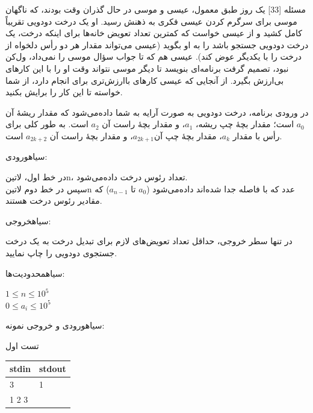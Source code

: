‌مسئله [33]
یک روز طبق معمول، عیسی و موسی در حال گذران وقت بودند، که ناگهان موسی برای سرگرم کردن عیسی فکری به ذهنش رسید. او یک درخت دودویی تقریباً کامل کشید و از عیسی خواست که کمترین تعداد تعویض خانه‌ها برای اینکه درخت، یک درخت دودویی جستجو باشد را به او بگوید (عیسی می‌تواند مقدار هر دو رأس دلخواه از درخت را با یکدیگر عوض کند). عیسی هم که تا جواب سؤال موسی را نمی‌داد، ول‌کن نبود، تصمیم گرفت برنامه‌ای بنویسد تا دیگر موسی نتواند وقت او را با این کارهای بی‌ارزش بگیرد. از آنجایی که عیسی کارهای باارزش‌تری برای انجام دارد، از شما خواسته تا این کار را برایش بکنید.
\par
در ورودی برنامه، درخت دودویی به صورت آرایه به شما داده‌می‌شود که مقدار ریشهٔ آن $a_0$ است؛ مقدار بچهٔ چپ ریشه، $a_1$، و مقدار بچهٔ راست آن $a_2$ است. به طور کلی برای رأس با مقدار $a_k$، مقدار بچهٔ چپ آن$a_{2k+1}$، و مقدار بچهٔ راست آن $a_{2k+2}$ است.

‌سیاه{ورودی:}
\par
در خط اول، ‌لاتین{n}، تعداد رئوس درخت داده‌می‌شود.\\
سپس در خط دوم ‌لاتین{n} عدد که با فاصله جدا شده‌اند داده‌می‌شود ($a_0$ تا $a_{n-1}$) که مقادیر رئوس درخت هستند.
\par
{}‌سیاه{خروجی:}
\par
در تنها سطر خروجی، حداقل تعداد تعویض‌های لازم برای تبدیل درخت به یک درخت جستجوی دودویی را چاپ نمایید.
\par
{}‌سیاه{محدودیت‌ها:}
\par
$1 \leq n \leq 10^{5}$\\
$0 \leq a_i \leq 10^5$\par

‌سیاه{ورودی و خروجی نمونه:}
\par
تست اول
\begin{latin}
	\begin{tabularx}{\textwidth}{|X | X|}
		\hline
		\textbf{stdin} &
		\textbf{stdout}\\
		\hline
		3 & 1\\
		1 2 3&\\
		\hline
	\end{tabularx}
\end{latin}

